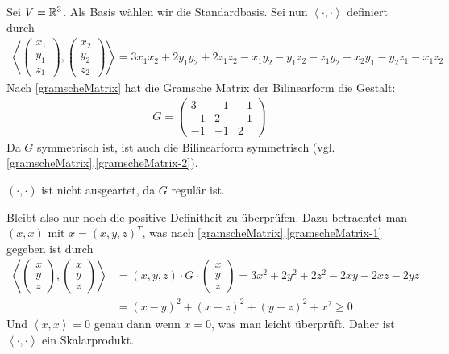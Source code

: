 Sei $V = \mathbb{R}^3$. Als Basis wählen wir die Standardbasis. Sei nun $\left\langle \cdot , \cdot \right\rangle$ definiert durch
\begin{align*}
        \left\langle
        \begin{pmatrix}
            x_1\\y_1\\z_1
        \end{pmatrix},
        \begin{pmatrix}
            x_2\\y_2\\z_2
        \end{pmatrix}
        \right\rangle = 3 x_1 x_2 + 2 y_1 y_2 + 2 z_1 z_2 - x_1 y_2 - y_1 z_2 - z_1 y_2 - x_2 y_1 - y_2 z_1 - x_1 z_2
\end{align*}
Nach \ref{gramscheMatrix} hat die Gramsche Matrix der Bilinearform die Gestalt:
\begin{align*}
        G =
        \begin{pmatrix}
            3 & -1 & -1\\
            -1 & 2 & -1\\
            -1 & -1 & 2
        \end{pmatrix}
\end{align*}
Da $G$ symmetrisch ist, ist auch die Bilinearform symmetrisch (vgl. \ref{gramscheMatrix}.\ref{gramscheMatrix-2}).

$(\cdot , \cdot)$ ist nicht ausgeartet, da $G$ regulär ist.

Bleibt also nur noch die positive Definitheit zu überprüfen.
Dazu betrachtet man $(x, x)$ mit $x = (x, y, z)^T$, was nach \ref{gramscheMatrix}.\ref{gramscheMatrix-1} gegeben ist durch
\begin{align*}
    \left\langle
    \begin{pmatrix}
        x\\y\\z
    \end{pmatrix},
    \begin{pmatrix}
        x\\y\\z
    \end{pmatrix}
    \right\rangle & = (x,y,z) \cdot G \cdot
    \begin{pmatrix}
        x\\y\\z
    \end{pmatrix} = 3x^2+2y^2+2z^2-2xy-2xz-2yz \\
    & = (x - y)^2 + (x - z)^2 + (y - z)^2 + x^2 \geq 0
\end{align*}
Und $\left\langle x, x \right\rangle = 0$ genau dann wenn $x = 0$, was man leicht überprüft.
Daher ist $\left\langle \cdot , \cdot \right\rangle$ ein Skalarprodukt.\\

